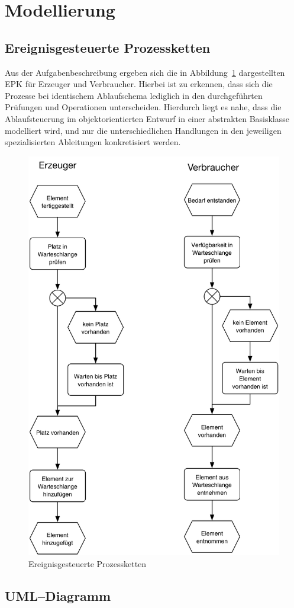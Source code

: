 \section{Modellierung} %
\label{sec:modellierung}

\subsection{Ereignisgesteuerte Prozessketten} %
\label{sub:ereignisgesteuerte_prozessketten}

Aus der Aufgabenbeschreibung ergeben sich die in Abbildung~\ref{fig:epk} dargestellten \ac{EPK} für Erzeuger und Verbraucher. Hierbei ist zu erkennen, dass sich die Prozesse bei identischem Ablaufschema lediglich in den  durchgeführten Prüfungen und Operationen unterscheiden. Hierdurch liegt es nahe, dass die Ablaufsteuerung im objektorientierten Entwurf in einer abstrakten Basisklasse modelliert wird, und nur die unterschiedlichen Handlungen in den jeweiligen spezialisierten Ableitungen konkretisiert werden.

\begin{figure}[H]
\begin{center}
\includegraphics[width=.5\textwidth]{Erzeuger-Verbraucher-EPK.jpg}
\caption{Ereignisgesteuerte Prozessketten}
\label{fig:epk}
\end{center}
\end{figure}


\subsection{UML–Diagramm} %

